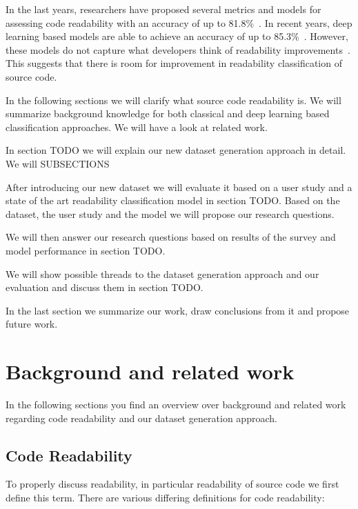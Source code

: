 \documentclass[%
class=scrreprt,
chapterprefix=false,%
open=right,%
twoside=false,%
paper=a4,%
logofile={Logo\_zentral\_farbig\_EN.png},%
thesistype=master,%
UKenglish,%
]{se2thesis}
\begin{document}
	In the last years, researchers have proposed several metrics and models for assessing code readability with an accuracy of up to 81.8\%~\cite{buse2009learning, posnett2011simpler, dorn2012general, daka2015modeling}. In recent years, deep learning based models are able to achieve an accuracy of up to 85.3\%~\cite{mi2018improving, mi2022towards}.
	However, these models do not capture what developers think of readability improvements~\cite{fakhoury2019improving}. This suggests that there is room for improvement in readability classification of source code. 
	
	In the following sections we will clarify what source code readability is. We will summarize background knowledge for both classical and deep learning based classification approaches. We will have a look at related work.
	
	In section TODO we will explain our new dataset generation approach in detail. We will SUBSECTIONS
	
	After introducing our new dataset we will evaluate it based on a user study and a state of the art readability classification model in section TODO. Based on the dataset, the user study and the model we will propose our research questions.
	
	We will then answer our research questions based on results of the survey and model performance in section TODO.
	
	We will show possible threads to the dataset generation approach and our evaluation and discuss them in section TODO.
	
	In the last section we summarize our work, draw conclusions from it and propose future work.
	
	\section{Background and related work} \label{Background and related work}
	In the following sections you find an overview over background and related work regarding code readability and our dataset generation approach.
	
	\subsection{Code Readability} \label{Readability}
	To properly discuss readability, in particular readability of source code we first define this term. There are various differing definitions for code readability:
	
\end{document}
